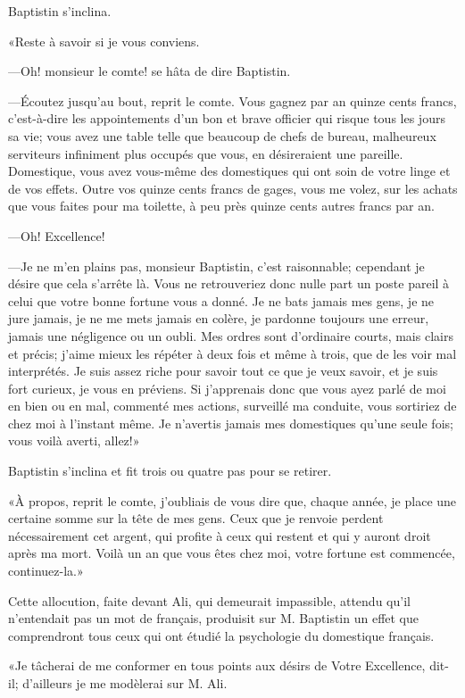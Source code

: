 Baptistin s'inclina. 

«Reste à savoir si je vous conviens.  

—Oh! monsieur le comte! se hâta de dire Baptistin. 

—Écoutez jusqu'au bout, reprit le comte. Vous gagnez par an quinze cents francs, c'est-à-dire les appointements d'un bon et brave officier qui risque tous les jours sa vie; vous avez une table telle que beaucoup de chefs de bureau, malheureux serviteurs infiniment plus occupés que vous, en désireraient une pareille. Domestique, vous avez vous-même des domestiques qui ont soin de votre linge et de vos effets. Outre vos quinze cents francs de gages, vous me volez, sur les achats que vous faites pour ma toilette, à peu près quinze cents autres francs par an. 

—Oh! Excellence! 

—Je ne m'en plains pas, monsieur Baptistin, c'est raisonnable; cependant je désire que cela s'arrête là. Vous ne retrouveriez donc nulle part un poste pareil à celui que votre bonne fortune vous a donné. Je ne bats jamais mes gens, je ne jure jamais, je ne me mets jamais en colère, je pardonne toujours une erreur, jamais une négligence ou un oubli. Mes ordres sont d'ordinaire courts, mais clairs et précis; j'aime mieux les répéter à deux fois et même à trois, que de les voir mal interprétés. Je suis assez riche pour savoir tout ce que je veux savoir, et je suis fort curieux, je vous en préviens. Si j'apprenais donc que vous ayez parlé de moi en bien ou en mal, commenté mes actions, surveillé ma conduite, vous sortiriez de chez moi à l'instant même. Je n'avertis jamais mes domestiques qu'une seule fois; vous voilà averti, allez!»  

Baptistin s'inclina et fit trois ou quatre pas pour se retirer. 

«À propos, reprit le comte, j'oubliais de vous dire que, chaque année, je place une certaine somme sur la tête de mes gens. Ceux que je renvoie perdent nécessairement cet argent, qui profite à ceux qui restent et qui y auront droit après ma mort. Voilà un an que vous êtes chez moi, votre fortune est commencée, continuez-la.» 

Cette allocution, faite devant Ali, qui demeurait impassible, attendu qu'il n'entendait pas un mot de français, produisit sur M. Baptistin un effet que comprendront tous ceux qui ont étudié la psychologie du domestique français. 

«Je tâcherai de me conformer en tous points aux désirs de Votre Excellence, dit-il; d'ailleurs je me modèlerai sur M. Ali. 

